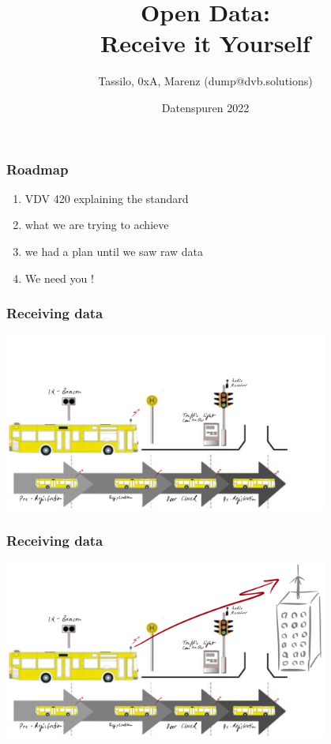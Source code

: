 \documentclass[aspectratio=169]{beamer}
\title{Open Data: \\ Receive it Yourself}
\date[ISPN ’80]{Datenspuren 2022}
\author[]{Tassilo, 0xA, Marenz (dump@dvb.solutions)}
\begin{document}
\begin{frame}\titlepage
\end{frame}
  
\begin{frame} 
\frametitle{Roadmap} 

\begin{enumerate}
    \item VDV 420 explaining the standard
    \item what we are trying to achieve
    \item we had a plan until we saw raw data
    \item We need you !
\end{enumerate}

\end{frame}

\begin{frame}
\frametitle{Receiving data}
\centering
\includegraphics[width=0.8\textwidth]{figs/lsa-beeinflussungs-stecke.pdf}
\end{frame}

\begin{frame}
\frametitle{Receiving data}
\centering
\includegraphics[width=0.8\textwidth]{figs/lsa-beeinflussungs-stecke-mit-antenne.pdf}
\end{frame}
\end{document}

